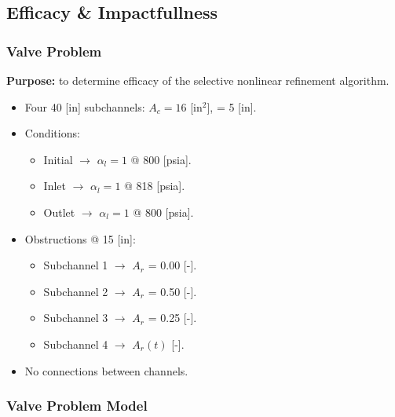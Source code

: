 \documentclass[compress,xcolor=table]{beamer}
\begin{document}
\subsection[Efficacy \& Impactfullness]{Efficacy \& Impactfullness}
\begin{frame}
\frametitle{Valve Problem}

\textbf{Purpose:} to determine efficacy of the selective nonlinear refinement algorithm.

\begin{itemize}
\item{Four 40 [in] subchannels: $A_{c} = 16$ [in$^{2}$], \dx{} = 5 [in].}
\item{Conditions:
	\begin{itemize}
	\item{Initial $\rightarrow$ $\alpha_{l} = 1$ @ 800 [psia].}
	\item{Inlet $\rightarrow$ $\alpha_{l} = 1$ @ 818 [psia].}
	\item{Outlet $\rightarrow$ $\alpha_{l} = 1$ @ 800 [psia].}
	\end{itemize}
}
\item{Obstructions @ 15 [in]:
\begin{itemize}
	\item{Subchannel 1 $\rightarrow$ $A_{r}$ = 0.00 [-].}
	\item{Subchannel 2 $\rightarrow$ $A_{r}$ = 0.50 [-].}
	\item{Subchannel 3 $\rightarrow$ $A_{r}$ = 0.25 [-].}
	\item{Subchannel 4 $\rightarrow$ $A_{r}(t)$ [-].}
\end{itemize}
}
\item{No connections between channels.}
\end{itemize}

\end{frame}
\begin{frame}
\frametitle{Valve Problem Model}

\begin{center}
\resizebox{0.75\textwidth}{0.75\textheight}{

}
\end{center}

\end{frame}
\end{document}
